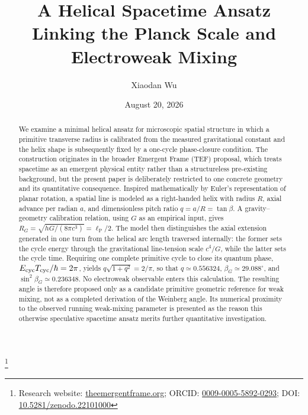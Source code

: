 \documentclass[aps,prd,reprint,nofootinbib,floatfix]{revtex4-2}
\begin{document}
\title{A Helical Spacetime Ansatz Linking the Planck Scale and Electroweak Mixing}

\author{Xiaodan Wu}
\thanks{Research website: \href{https://theemergentframe.org}{theemergentframe.org}; ORCID: \href{https://orcid.org/0009-0005-5892-0293}{0009-0005-5892-0293}; DOI: \href{https://doi.org/10.5281/zenodo.22101000}{10.5281/zenodo.22101000}}

\date{August 20, 2026}

\begin{abstract}
We examine a minimal helical ansatz for microscopic spatial structure in which a primitive transverse radius is calibrated from the measured gravitational constant and the helix shape is subsequently fixed by a one-cycle phase-closure condition. The construction originates in the broader Emergent Frame (TEF) proposal, which treats spacetime as an emergent physical entity rather than a structureless pre-existing background, but the present paper is deliberately restricted to one concrete geometry and its quantitative consequence. Inspired mathematically by Euler's representation of planar rotation, a spatial line is modeled as a right-handed helix with radius $R$, axial advance per radian $a$, and dimensionless pitch ratio $q=a/R=\tan\beta$. A gravity--geometry calibration relation, using $G$ as an empirical input, gives $R_G=\sqrt{hG/(8\pi c^3)}=\ell_{\mathrm P}/2$. The model then distinguishes the axial extension generated in one turn from the helical arc length traversed internally: the former sets the cycle energy through the gravitational line-tension scale $c^4/G$, while the latter sets the cycle time. Requiring one complete primitive cycle to close its quantum phase, $E_{\rm cyc}T_{\rm cyc}/\hbar=2\pi$, yields $q\sqrt{1+q^2}=2/\pi$, so that $q\simeq0.556324$, $\beta_G\simeq29.088^\circ$, and $\sin^2\beta_G\simeq0.236348$. No electroweak observable enters this calculation. The resulting angle is therefore proposed only as a candidate primitive geometric reference for weak mixing, not as a completed derivation of the Weinberg angle. Its numerical proximity to the observed running weak-mixing parameter is presented as the reason this otherwise speculative spacetime ansatz merits further quantitative investigation.
\end{abstract}

\maketitle
\end{document}
